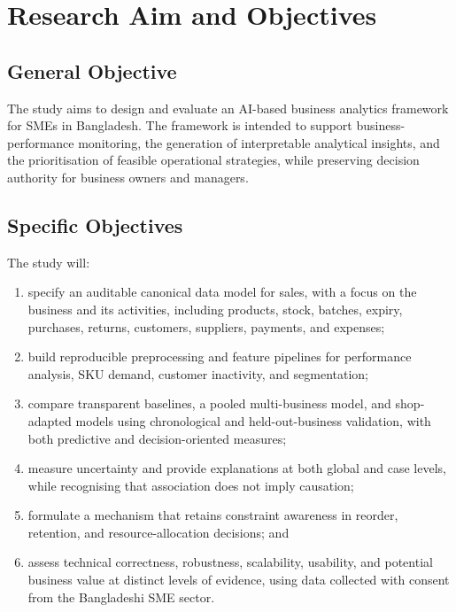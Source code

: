 \documentclass[a4paper,11pt,oneside]{book}
\theoremstyle{plain}
\theoremstyle{definition}
\theoremstyle{remark}
\begin{document}
\section{Research Aim and Objectives}

\subsection{General Objective}

The study aims to design and evaluate an AI-based business analytics
framework for SMEs in Bangladesh. The framework is intended to support
business-performance monitoring, the generation of interpretable analytical
insights, and the prioritisation of feasible operational strategies, while
preserving decision authority for business owners and managers.


\subsection{Specific Objectives}

The study will:

\begin{enumerate}[label=O\arabic*.]

\item specify an auditable canonical data model for sales, with a focus on the business and its activities, including products, stock, batches, expiry, purchases, returns, customers, suppliers, payments, and expenses;

\item build reproducible preprocessing and feature pipelines for performance analysis, SKU demand, customer inactivity, and segmentation;

\item compare transparent baselines, a pooled multi-business model, and shop-adapted models using chronological and held-out-business validation, with both predictive and decision-oriented measures;

\item measure uncertainty and provide explanations at both global and case levels, while recognising that association does not imply causation;

\item formulate a mechanism that retains constraint awareness in reorder, retention, and resource-allocation decisions; and

\item assess technical correctness, robustness, scalability, usability, and potential business value at distinct levels of evidence, using data collected with consent from the Bangladeshi SME sector.

\end{enumerate}
\end{document}
